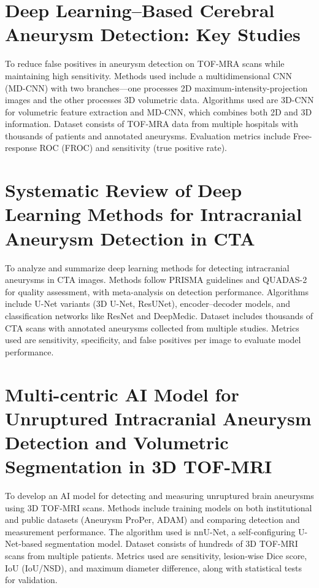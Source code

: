 \documentclass[twoside,a4paper,openright]{report} %
\begin{document}
\section{\textbf{Deep Learning–Based Cerebral Aneurysm Detection: Key Studies}}
\sloppy
To reduce false positives in aneurysm detection on TOF-MRA scans while maintaining high sensitivity. Methods used include a multidimensional CNN (MD-CNN) with two branches—one processes 2D maximum-intensity-projection images and the other processes 3D volumetric data. Algorithms used are 3D-CNN for volumetric feature extraction and MD-CNN, which combines both 2D and 3D information. Dataset consists of TOF-MRA data from multiple hospitals with thousands of patients and annotated aneurysms. Evaluation metrics include Free-response ROC (FROC) and sensitivity (true positive rate).

\section{\textbf{Systematic Review of Deep Learning Methods for Intracranial Aneurysm Detection in CTA}}
\sloppy
To analyze and summarize deep learning methods for detecting intracranial aneurysms in CTA images. Methods follow PRISMA guidelines and QUADAS-2 for quality assessment, with meta-analysis on detection performance. Algorithms include U-Net variants (3D U-Net, ResUNet), encoder–decoder models, and classification networks like ResNet and DeepMedic. Dataset includes thousands of CTA scans with annotated aneurysms collected from multiple studies. Metrics used are sensitivity, specificity, and false positives per image to evaluate model performance.

\section{\textbf{Multi-centric AI Model for Unruptured Intracranial Aneurysm Detection and Volumetric Segmentation in 3D TOF-MRI}}
\sloppy
To develop an AI model for detecting and measuring unruptured brain aneurysms using 3D TOF-MRI scans. Methods include training models on both institutional and public datasets (Aneurysm ProPer, ADAM) and comparing detection and measurement performance. The algorithm used is nnU-Net, a self-configuring U-Net-based segmentation model. Dataset consists of hundreds of 3D TOF-MRI scans from multiple patients. Metrics used are sensitivity, lesion-wise Dice score, IoU (IoU/NSD), and maximum diameter difference, along with statistical tests for validation.
\end{document}
